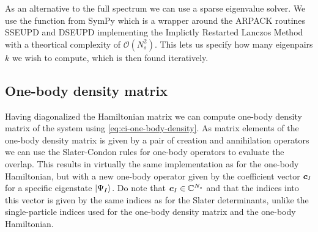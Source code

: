             As an alternative to the full spectrum we can use a sparse
            eigenvalue solver.
            We use the function  from SymPy
            \cite{sympy} which is a wrapper around the ARPACK routines SSEUPD
            and DSEUPD \cite{arpack} implementing the Implictly Restarted
            Lanczos Method with a theortical complexity of $\mathcal{O}(N_s^2)$.
            This lets us specify how many eigenpairs $k$ we wish to compute,
            which is then found iteratively.

        \subsection{One-body density matrix}
            Having diagonalized the Hamiltonian matrix we can compute one-body
            density matrix of the system using \autoref{eq:ci-one-body-density}.
            As matrix elements of the one-body density matrix is given by a pair
            of creation and annihilation operators we can use the Slater-Condon
            rules for one-body operators to evaluate the overlap.
            This results in virtually the same implementation as for the
            one-body Hamiltonian, but with a new one-body operator given by the
            coefficient vector $\boldsymbol{c}_I$ for a specific eigenstate
            $\ket{\Psi_I}$.
            Do note that $\boldsymbol{c}_I \in \mathbb{C}^{N_s}$ and that the indices
            into this vector is given by the same indices as for the Slater
            determinants, unlike the single-particle indices used for the
            one-body density matrix and the one-body Hamiltonian.

